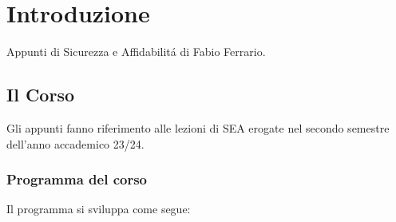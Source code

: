 \chapter{Introduzione}

Appunti di Sicurezza e Affidabilitá di Fabio Ferrario.

\section*{Il Corso}
Gli appunti fanno riferimento alle lezioni di SEA erogate nel secondo semestre dell'anno accademico 23/24.

\subsection*{Programma del corso}
Il programma si sviluppa come segue:
